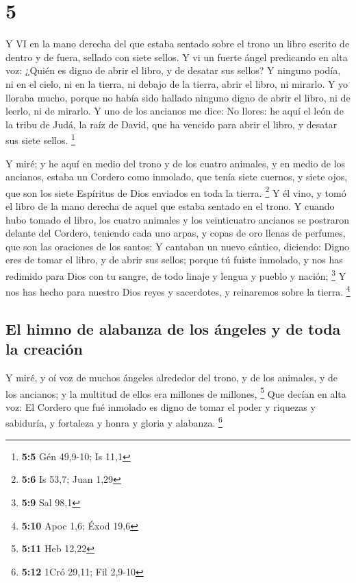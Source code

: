 \hypertarget{section-4}{%
\section{5}\label{section-4}}

 Y VI en la mano derecha del que estaba sentado sobre el
trono un libro escrito de dentro y de fuera, sellado con siete sellos.
 Y vi un fuerte ángel predicando en alta voz: ¿Quién es
digno de abrir el libro, y de desatar sus sellos?  Y ninguno
podía, ni en el cielo, ni en la tierra, ni debajo de la tierra, abrir el
libro, ni mirarlo.  Y yo lloraba mucho, porque no había sido
hallado ninguno digno de abrir el libro, ni de leerlo, ni de mirarlo.
 Y uno de los ancianos me dice: No llores: he aquí el león
de la tribu de Judá, la raíz de David, que ha vencido para abrir el
libro, y desatar sus siete sellos. \footnote{\textbf{5:5} Gén 49,9-10;
  Is 11,1}

 Y miré; y he aquí en medio del trono y de los cuatro
animales, y en medio de los ancianos, estaba un Cordero como inmolado,
que tenía siete cuernos, y siete ojos, que son los siete Espíritus de
Dios enviados en toda la tierra. \footnote{\textbf{5:6} Is 53,7; Juan
  1,29}  Y él vino, y tomó el libro de la mano derecha de
aquel que estaba sentado en el trono.  Y cuando hubo tomado
el libro, los cuatro animales y los veinticuatro ancianos se postraron
delante del Cordero, teniendo cada uno arpas, y copas de oro llenas de
perfumes, que son las oraciones de los santos:  Y cantaban
un nuevo cántico, diciendo: Digno eres de tomar el libro, y de abrir sus
sellos; porque tú fuiste inmolado, y nos has redimido para Dios con tu
sangre, de todo linaje y lengua y pueblo y nación; \footnote{\textbf{5:9}
  Sal 98,1}  Y nos has hecho para nuestro Dios reyes y
sacerdotes, y reinaremos sobre la tierra. \footnote{\textbf{5:10} Apoc
  1,6; Éxod 19,6}

\hypertarget{el-himno-de-alabanza-de-los-uxe1ngeles-y-de-toda-la-creaciuxf3n}{%
\subsection{El himno de alabanza de los ángeles y de toda la
creación}\label{el-himno-de-alabanza-de-los-uxe1ngeles-y-de-toda-la-creaciuxf3n}}

 Y miré, y oí voz de muchos ángeles alrededor del trono, y
de los animales, y de los ancianos; y la multitud de ellos era millones
de millones, \footnote{\textbf{5:11} Heb 12,22}  Que decían
en alta voz: El Cordero que fué inmolado es digno de tomar el poder y
riquezas y sabiduría, y fortaleza y honra y gloria y alabanza.
\footnote{\textbf{5:12} 1Cró 29,11; Fil 2,9-10}

